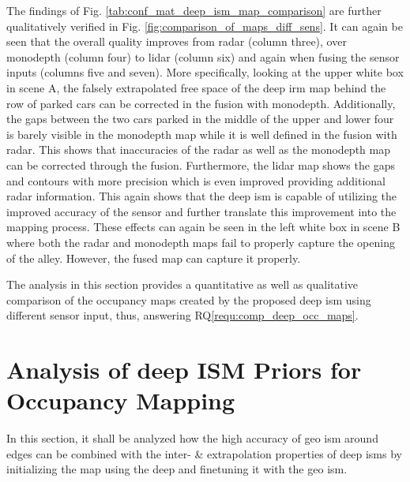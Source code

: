 The findings of Fig. \ref{tab:conf_mat_deep_ism_map_comparison} are further qualitatively verified in Fig. \ref{fig:comparison_of_maps_diff_sens}. It can again be seen that the overall quality improves from radar (column three), over \gls{monodepth} (column four) to lidar (column six) and again when fusing the sensor inputs (columns five and seven). More specifically, looking at the upper white box in scene A, the falsely extrapolated free space of the deep \gls{irm} map behind the row of parked cars can be corrected in the fusion with \gls{monodepth}. Additionally, the gaps between the two cars parked in the middle of the upper and lower four is barely visible in the \gls{monodepth} map while it is well defined in the fusion with radar. This shows that inaccuracies of the radar as well as the \gls{monodepth} map can be corrected through the fusion. Furthermore, the lidar map shows the gaps and contours with more precision which is even improved providing additional radar information. This again shows that the deep \gls{ism} is capable of utilizing the improved accuracy of the sensor and further translate this improvement into the mapping process. These effects can again be seen in the left white box in scene B where both the radar and \gls{monodepth} maps fail to properly capture the opening of the alley. However, the fused map can capture it properly.
\begin{center}
\end{center}
The analysis in this section provides a quantitative as well as qualitative comparison of the occupancy maps created by the proposed deep \gls{ism} using different sensor input, thus, answering RQ\ref{requ:comp_deep_occ_maps}.
%
\section{Analysis of deep ISM Priors for Occupancy Mapping}
\label{sec:exp_analyze_prior_properties}
In this section, it shall be analyzed how the high accuracy of geo \gls{ism} around edges can be combined with the inter- \& extrapolation properties of deep \gls{ism}s by initializing the map using the deep and finetuning it with the geo \gls{ism}.
%
